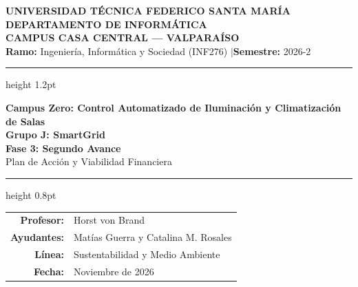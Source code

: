 

\thispagestyle{empty}

\begin{center}
    {\large \textbf{UNIVERSIDAD TÉCNICA FEDERICO SANTA MARÍA}}\\[0.2em]
    {\normalsize \textbf{DEPARTAMENTO DE INFORMÁTICA}}\\[0.2em]
    {\small \textbf{CAMPUS CASA CENTRAL --- VALPARAÍSO}}\\[0.3em]
    {\footnotesize \textbf{Ramo:} Ingeniería, Informática y Sociedad (INF276)
    \quad$\vert$\quad \textbf{Semestre:} 2026-2}\\[1.0em]

    \hrule height 1.2pt
    \vspace{0.8em}

    {\LARGE \textbf{Campus Zero: Control Automatizado de Iluminación y Climatización de Salas}}\\[0.4em]

    {\large \textbf{Grupo J: SmartGrid}}\\[0.5em]

    {\large \textbf{Fase 3: Segundo Avance}}\\[0.2em]
    {\normalsize Plan de Acción y Viabilidad Financiera}\\[0.6em]

    \hrule height 0.8pt
    \vspace{0.8em}
\end{center}


\begin{center}
\begin{tabular}{rl}
    \textbf{Profesor:} & Horst von Brand \\[3pt]
    \textbf{Ayudantes:} & Matías Guerra y Catalina M. Rosales \\[3pt]
    \textbf{Línea:} & Sustentabilidad y Medio Ambiente \\[3pt]
    \textbf{Fecha:} & Noviembre de 2026 \\
\end{tabular}
\end{center}

